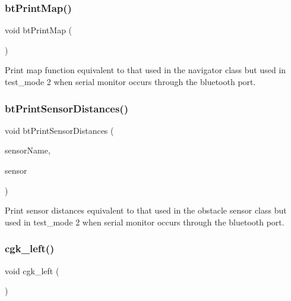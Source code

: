 \mbox{\label{bot_main_8ino_afe9e137a49398f1d502cfbeaa4f25f45}} 
\subsubsection{\texorpdfstring{bt\+Print\+Map()}{btPrintMap()}}
{\footnotesize\ttfamily void bt\+Print\+Map (\begin{DoxyParamCaption}{ }\end{DoxyParamCaption})}

Print map function equivalent to that used in the navigator class but used in test\+\_\+mode 2 when serial monitor occurs through the bluetooth port. \mbox{\label{bot_main_8ino_aa06c138d870f51c3482c99ed475f9d58}} 
\subsubsection{\texorpdfstring{bt\+Print\+Sensor\+Distances()}{btPrintSensorDistances()}}
{\footnotesize\ttfamily void bt\+Print\+Sensor\+Distances (\begin{DoxyParamCaption}\item[{String}]{sensor\+Name,  }\item[{\mbox{\hyperlink{class_obstacle_sensor}{Obstacle\+Sensor}} $\ast$}]{sensor }\end{DoxyParamCaption})}

Print sensor distances equivalent to that used in the obstacle sensor class but used in test\+\_\+mode 2 when serial monitor occurs through the bluetooth port. \mbox{\label{bot_main_8ino_aa715717e784a7e14ea274f10f05717c0}} 
\subsubsection{\texorpdfstring{cgk\+\_\+left()}{cgk\_left()}}
{\footnotesize\ttfamily void cgk\+\_\+left (\begin{DoxyParamCaption}{ }\end{DoxyParamCaption})}



